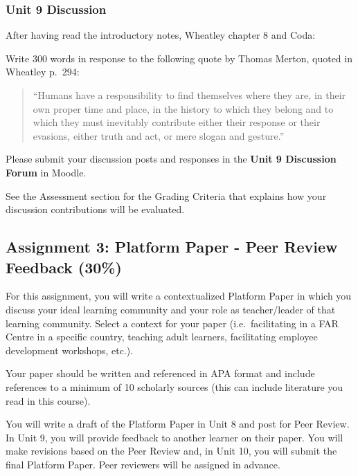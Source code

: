 \documentclass[
]{book}
\begin{document}
\begin{assessment}
\hypertarget{unit-9-discussion}{%
\subsubsection*{Unit 9 Discussion}\label{unit-9-discussion}}

After having read the introductory notes, Wheatley chapter 8 and Coda:

Write 300 words in response to the following quote by Thomas Merton,
quoted in Wheatley p.~294:

\begin{quote}
``Humans have a responsibility to find themselves where they are, in
their own proper time and place, in the history to which they belong and
to which they must inevitably contribute either their response or their
evasions, either truth and act, or mere slogan and gesture.''
\end{quote}

Please submit your discussion posts and responses in the \textbf{Unit 9
Discussion Forum} in Moodle.

See the Assessment section for the Grading Criteria that explains how
your discussion contributions will be evaluated.

\hypertarget{assignment-3-platform-paper---peer-review-feedback-30}{%
\subsection*{Assignment 3: Platform Paper - Peer Review Feedback
(30\%)}\label{assignment-3-platform-paper---peer-review-feedback-30}}

For this assignment, you will write a contextualized Platform Paper in
which you discuss your ideal learning community and your role as
teacher/leader of that learning community. Select a context for your
paper (i.e.~facilitating in a FAR Centre in a specific country, teaching
adult learners, facilitating employee development workshops, etc.).

Your paper should be written and referenced in APA format and include
references to a minimum of 10 scholarly sources (this can include
literature you read in this course).

You will write a draft of the Platform Paper in Unit 8 and post for Peer
Review. In Unit 9, you will provide feedback to another learner on their
paper. You will make revisions based on the Peer Review and, in Unit 10,
you will submit the final Platform Paper. Peer reviewers will be
assigned in advance.


\end{assessment}
\end{document}
